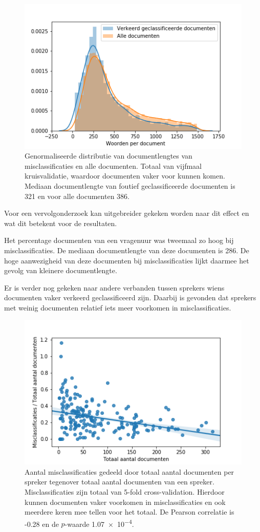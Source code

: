 \begin{figure}[H]
  \centering
    \includegraphics[width=0.40\paperwidth]{Verslag/Tables/misclassifiedlengths.png}
\caption{Genormaliseerde distributie van documentlengtes van misclassificaties en alle documenten. Totaal van vijfmaal kruisvalidatie, waardoor documenten vaker voor kunnen komen. Mediaan documentlengte van foutief geclassificeerde documenten is 321 en voor alle documenten 386.}
\label{fig:misclassified}
\end{figure}
Voor een vervolgonderzoek kan uitgebreider gekeken worden naar dit effect en wat dit betekent voor de resultaten. \par
Het percentage documenten van een vragenuur was tweemaal zo hoog bij misclassificaties. De mediaan documentlengte van deze documenten is 286. De hoge aanwezigheid van deze documenten bij misclassificaties lijkt daarmee het gevolg van kleinere documentlengte.\par
Er is verder nog gekeken naar andere verbanden tussen sprekers wiens documenten vaker verkeerd geclassificeerd zijn. Daarbij is gevonden dat sprekers met weinig documenten relatief iets meer voorkomen in misclassificaties.
\begin{figure}[H]
  \centering
    \includegraphics[width=0.50\paperwidth]{Verslag/Tables/misclassifiedsprekers.png}
\caption{Aantal misclassificaties gedeeld door totaal aantal documenten per spreker tegenover totaal aantal documenten van een spreker. Misclassificaties zijn totaal van 5-fold cross-validation. Hierdoor kunnen documenten vaker voorkomen in misclassificaties en ook meerdere keren mee tellen voor het totaal. De Pearson correlatie is -0.28 en de $p$-waarde \num{1.07e-4}.}
\label{fig:misclassifiedsprekers}
\end{figure}
